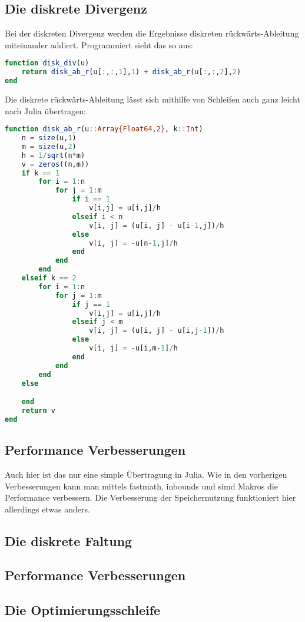 \documentclass{article}
\theoremstyle{case}
\begin{document}
\subsection{Die diskrete Divergenz}
Bei der diskreten Divergenz werden die Ergebnisse diskreten rückwärts-Ableitung miteinander addiert. Programmiert sieht das so aus:
\begin{lstlisting}[language=Julia]
function disk_div(u)
	return disk_ab_r(u[:,:,1],1) + disk_ab_r(u[:,:,2],2)
end
\end{lstlisting}
Die diskrete rückwärts-Ableitung lässt sich mithilfe von Schleifen auch ganz leicht nach Julia übertragen:
\begin{lstlisting}[language=Julia]
function disk_ab_r(u::Array{Float64,2}, k::Int)
	n = size(u,1)
	m = size(u,2)
	h = 1/sqrt(n*m)
	v = zeros((n,m))
	if k == 1
		for i = 1:n
			for j = 1:m
				if i == 1
					v[i,j] = u[i,j]/h
				elseif i < n
					v[i, j] = (u[i, j] - u[i-1,j])/h
				else
					v[i, j] = -u[n-1,j]/h
				end
			end
		end
	elseif k == 2
		for i = 1:n
			for j = 1:m
				if j == 1
					v[i,j] = u[i,j]/h
				elseif j < m
					v[i, j] = (u[i, j] - u[i,j-1])/h
				else
					v[i, j] = -u[i,m-1]/h
				end
			end
		end
	else

	end
	return v
end
\end{lstlisting}


\subsection*{Performance Verbesserungen}
Auch hier ist das nur eine simple Übertragung in Julia. Wie in den vorherigen Verbesserungen kann man mittels fastmath, inbounds und simd Makros die Performance verbessern. Die Verbesserung der Speichernutzung funktioniert hier allerdings etwas anders.


\subsection{Die diskrete Faltung}

\subsection*{Performance Verbesserungen}

\subsection{Die Optimierungsschleife}



%
%
\end{document}
